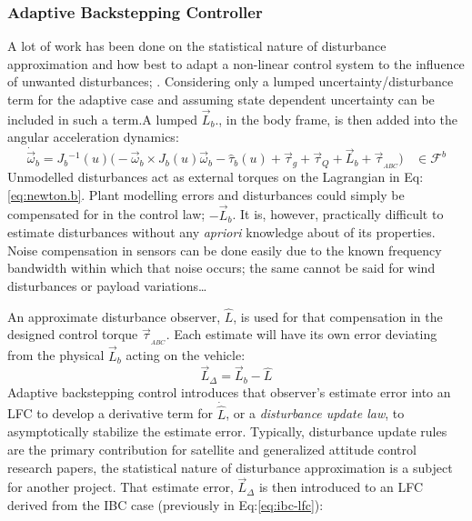 {\subsubsection{Adaptive Backstepping Controller}
\label{subsubsec:control.attitude.nonlinear.adaptivebackstep}
A lot of work has been done on the statistical nature of disturbance approximation and how best to adapt a non-linear control system to the influence of unwanted disturbances; \cite{nonlineardisturbance,disturbanceadaptivebackstepping,robusttrackingcontrol}. Considering only a lumped uncertainty/disturbance term for the adaptive case and assuming state dependent uncertainty can be included in such a term.A lumped $\vec{L}_b$., in the body frame, is then added into the angular acceleration dynamics:
\begin{equation}
\dot{\vec{\omega}}_b=J_b\text{}^{-1}(u)\big(-\vec{\omega}_b\times J_b(u)\vec{\omega}_b-\hat{\tau}_b(u)+\vec{\tau}_g+\vec{\tau}_Q+\vec{L}_b+\vec{\tau}_{_{ABC}}\big)~~~~\in\mathcal{F}^{b}
\end{equation}
Unmodelled disturbances act as external torques on the Lagrangian in Eq:\ref{eq:newton.b}. Plant modelling errors and disturbances could simply be compensated for in the control law; $-\vec{L}_b$. It is, however, practically difficult to estimate disturbances without any \emph{apriori} knowledge about of its properties. Noise compensation in sensors can be done easily due to the known frequency bandwidth within which that noise occurs; the same cannot be said for wind disturbances or payload variations\ldots
\par
An approximate disturbance observer, $\hat{L}$, is used for that compensation in the designed control torque $\vec{\tau}_{_{ABC}}$. Each estimate will have its own error deviating from the physical $\vec{L}_b$ acting on the vehicle:
\begin{equation}\label{eq:estimate-error}
\vec{L}_\Delta=\vec{L}_b-\hat{L}
\end{equation}
Adaptive backstepping control introduces that observer's estimate error into an LFC to develop a derivative term for $\dot{\hat{L}}$, or a \emph{disturbance update law}, to asymptotically stabilize the estimate error. Typically, disturbance update rules are the primary contribution for satellite and generalized attitude control research papers, the statistical nature of disturbance approximation is a subject for another project. That estimate error, $\vec{L}_\Delta$ is then introduced to an LFC derived from the IBC case (previously in Eq:\ref{eq:ibc-lfc}):
}
